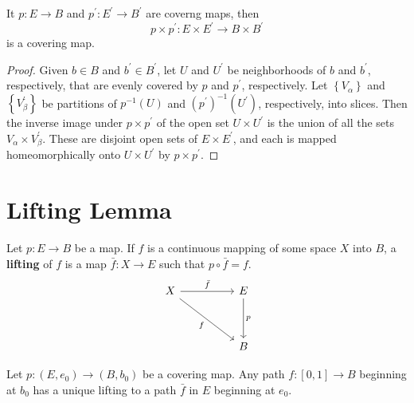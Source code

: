 \documentclass[12pt, a4paper, oneside]{book}
\begin{document}
\begin{theorem}
    It $p: E \rightarrow B$ and $p^{\prime}: E^{\prime} \rightarrow B^{\prime}$ are coverng maps, then
    \begin{equation*}
        p \times p^{\prime}: E \times E^{\prime} \rightarrow B \times B^{\prime}
    \end{equation*}
    is a covering map.

    \begin{proof}
        Given $b \in B$ and $b^{\prime} \in B^{\prime}$, let $U$ and $U^{\prime}$ be neighborhoods of $b$ and $b^{\prime}$, respectively, that are evenly covered by $p$ and $p^{\prime}$, respectively. Let $\left\{V_\alpha\right\}$ and $\left\{V_\beta^{\prime}\right\}$ be partitions of $p^{-1}(U)$ and $\left(p^{\prime}\right)^{-1}\left(U^{\prime}\right)$, respectively, into slices. Then the inverse image under $p \times p^{\prime}$ of the open set $U \times U^{\prime}$ is the union of all the sets $V_\alpha \times V_\beta^{\prime}$. These are disjoint open sets of $E \times E^{\prime}$, and each is mapped homeomorphically onto $U \times U^{\prime}$ by $p \times p^{\prime}$.
    \end{proof}
\end{theorem}











\section{Lifting Lemma}

\begin{definition}
    Let $p :E \rightarrow B$ be a map. If $f$ is a continuous mapping of some space $X$ into $B$, a \textbf{lifting} of $f$ is a map $\bar{f}: X \rightarrow E$ such that $p \circ \bar{f}=f$.
    \begin{equation*}
        \begin{tikzcd}
            X \arrow[rr, "\bar{f}"] \arrow[rrdd, "f"'] &  & E \arrow[dd, "p"] \\
            &  &    \\
            &  & B
        \end{tikzcd}
    \end{equation*}
\end{definition}

\begin{theorem}
    Let $p: \left(E,e_0\right) \rightarrow \left(B,b_0\right)$ be a covering map.
    Any path $f: [0,1] \rightarrow B$ beginning at $b_0$ has a unique lifting to a path $\bar{f}$ in $E$ beginning at $e_0$.
\end{theorem}
\end{document}

